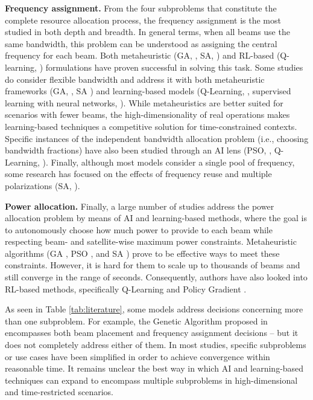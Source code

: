 \documentclass[letterpaper]{article} %
\begin{document}
\textbf{Frequency assignment.} From the four subproblems that constitute the complete resource allocation process, the frequency assignment is the most studied in both depth and breadth. In general terms, when all beams use the same bandwidth, this problem can be understood as assigning the central frequency for each beam. Both metaheuristic (GA, \cite{He2017, tirmizi2015efficient}, SA, \cite{vidal2020joint}) and RL-based (Q-learning, \cite{Hu2018ASystems}) formulations have proven successful in solving this task. Some studies do consider flexible bandwidth and address it with both metaheuristic frameworks (GA, \cite{Angeletti2006, Paris2019}, SA \cite{Cocco2018}) and learning-based models (Q-Learning, \cite{liao2020distributed, zheng2020leo}, supervised learning with neural networks, \cite{Funabiki1997, Salcedo-Sanz2005}). While metaheuristics are better suited for scenarios with fewer beams, the high-dimensionality of real operations makes learning-based techniques a competitive solution for time-constrained contexts. Specific instances of the independent bandwidth allocation problem (i.e., choosing bandwidth fractions) have also been studied through an AI lens (PSO, \cite{pachler20b}, Q-Learning, \cite{Ferreira2018}). Finally, although most models consider a single pool of frequency, some research has focused on the effects of frequency reuse and multiple polarizations (SA, \cite{Camino2014}).

\textbf{Power allocation.} Finally, a large number of studies address the power allocation problem by means of AI and learning-based methods, where the goal is to autonomously choose how much power to provide to each beam while respecting beam- and satellite-wise maximum power constraints. Metaheuristic algorithms (GA \cite{Aravanis2015, Anzalchi2010, Paris2019}, PSO \cite{Durand2017, pachler20b}, and SA \cite{vidal2020joint, Cocco2018}) prove to be effective ways to meet these constraints. However, it is hard for them to scale up to thousands of beams and still converge in the range of seconds. Consequently, authors have also looked into RL-based methods, specifically Q-Learning \cite{zhang2020online, liao2020distributed, Ferreira2018} and Policy Gradient \cite{Luis2019, Luis2020}.

As seen in Table \ref{tab:literature}, some models address decisions concerning more than one subproblem. For example, the Genetic Algorithm proposed in \cite{Angeletti2006} encompasses both beam placement and frequency assignment decisions -- but it does not completely address either of them. In most studies, specific subproblems or use cases have been simplified in order to achieve convergence within reasonable time. It remains unclear the best way in which AI and learning-based techniques can expand to encompass multiple subproblems in high-dimensional and time-restricted scenarios.
\end{document}
